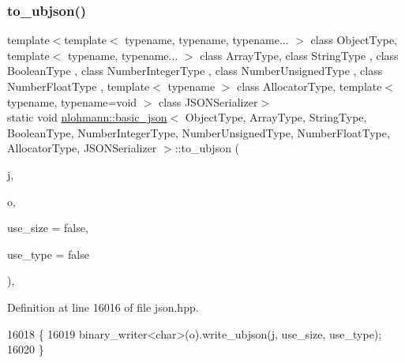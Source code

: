 \subsubsection{\texorpdfstring{to\+\_\+ubjson()}{to\_ubjson()}\hspace{0.1cm}{\footnotesize\ttfamily [3/3]}}
{\footnotesize\ttfamily template$<$template$<$ typename, typename, typename... $>$ class Object\+Type, template$<$ typename, typename... $>$ class Array\+Type, class String\+Type , class Boolean\+Type , class Number\+Integer\+Type , class Number\+Unsigned\+Type , class Number\+Float\+Type , template$<$ typename $>$ class Allocator\+Type, template$<$ typename, typename=void $>$ class J\+S\+O\+N\+Serializer$>$ \\
static void \hyperlink{classnlohmann_1_1basic__json}{nlohmann\+::basic\+\_\+json}$<$ Object\+Type, Array\+Type, String\+Type, Boolean\+Type, Number\+Integer\+Type, Number\+Unsigned\+Type, Number\+Float\+Type, Allocator\+Type, J\+S\+O\+N\+Serializer $>$\+::to\+\_\+ubjson (\begin{DoxyParamCaption}\item[{const \hyperlink{classnlohmann_1_1basic__json}{basic\+\_\+json}$<$ Object\+Type, Array\+Type, String\+Type, Boolean\+Type, Number\+Integer\+Type, Number\+Unsigned\+Type, Number\+Float\+Type, Allocator\+Type, J\+S\+O\+N\+Serializer $>$ \&}]{j,  }\item[{\hyperlink{classnlohmann_1_1detail_1_1output__adapter}{detail\+::output\+\_\+adapter}$<$ char $>$}]{o,  }\item[{const bool}]{use\+\_\+size = {\ttfamily false},  }\item[{const bool}]{use\+\_\+type = {\ttfamily false} }\end{DoxyParamCaption})\hspace{0.3cm}{\ttfamily [inline]}, {\ttfamily [static]}}



Definition at line 16016 of file json.\+hpp.


\begin{DoxyCode}
16018     \{
16019         binary\_writer<char>(o).write\_ubjson(j, use\_size, use\_type);
16020     \}
\end{DoxyCode}
\mbox{\label{classnlohmann_1_1basic__json_a2b2d781d7f2a4ee41bc0016e931cadf7}} 
